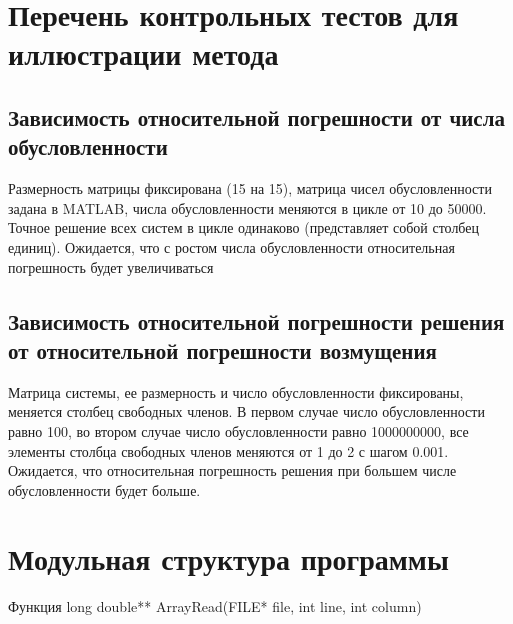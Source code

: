 \section{Перечень контрольных тестов для иллюстрации метода}

\subsection{Зависимость относительной погрешности от числа обусловленности}

Размерность матрицы фиксирована (15 на 15), матрица чисел обусловленности задана в MATLAB, числа обусловленности меняются в цикле от 10 до 50000. Точное решение всех систем в цикле одинаково (представляет собой столбец единиц). Ожидается, что с ростом числа обусловленности относительная погрешность будет увеличиваться

\subsection{Зависимость относительной погрешности решения от относительной погрешности возмущения}

Матрица системы, ее размерность и число обусловленности фиксированы, меняется столбец свободных членов. В первом случае число обусловленности равно 100, во втором случае число обусловленности равно 1000000000, все элементы столбца свободных членов меняются от 1 до 2 с шагом 0.001. Ожидается, что относительная погрешность решения при большем числе обусловленности будет больше.

\section{Модульная структура программы}

Функция long double** ArrayRead(FILE* file, int line, int column)

